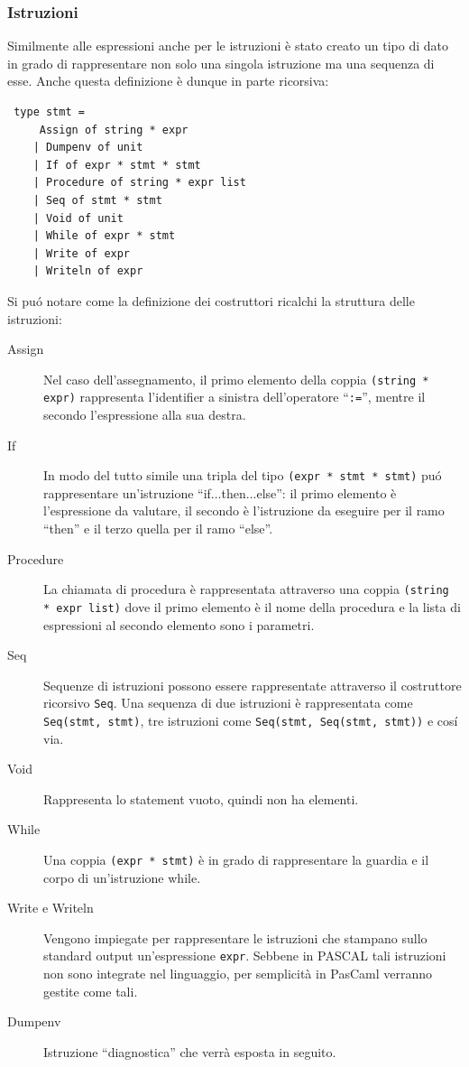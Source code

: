 \documentclass[a4paper,10pt]{article}
\begin{document}
\subsubsection{Istruzioni}
Similmente alle espressioni anche per le istruzioni \`e stato creato un tipo di
dato in grado di rappresentare non solo una singola istruzione ma una sequenza
di esse. Anche questa definizione \`e dunque in parte ricorsiva:

\begin{verbatim}
 type stmt =
     Assign of string * expr
    | Dumpenv of unit
    | If of expr * stmt * stmt
    | Procedure of string * expr list
    | Seq of stmt * stmt
    | Void of unit
    | While of expr * stmt
    | Write of expr
    | Writeln of expr
\end{verbatim}
Si pu\'o notare come la definizione dei costruttori ricalchi la struttura delle
istruzioni:
\begin{description}
 \item[Assign] Nel caso dell'assegnamento, il primo elemento della
coppia \verb|(string * expr)| rappresenta l'identifier a sinistra dell'operatore
``\verb|:=|'', mentre il secondo l'espressione alla sua destra.

\item[If] In modo del tutto simile una tripla del tipo 
\verb|(expr * stmt * stmt)| pu\'o rappresentare un'istruzione
``if...then...else'': il primo elemento \`e l'espressione da valutare, il
secondo \`e l'istruzione da eseguire per il ramo ``then'' e il terzo quella per
il ramo ``else''.

\item[Procedure] La chiamata di procedura \`e rappresentata attraverso una
coppia \verb|(string * expr list)| dove il primo elemento \`e il nome della
procedura e la lista di espressioni al secondo elemento sono i parametri.

\item[Seq] Sequenze di istruzioni possono essere rappresentate attraverso il
costruttore ricorsivo \verb|Seq|. Una sequenza di due istruzioni \`e
rappresentata come \verb|Seq(stmt, stmt)|, tre istruzioni come
\verb|Seq(stmt, Seq(stmt, stmt))| e cos\'i via.

\item[Void] Rappresenta lo statement vuoto, quindi non ha elementi.

\item[While] Una coppia \verb|(expr * stmt)| \`e in grado di rappresentare la
guardia e il corpo di un'istruzione while.

\item[Write e Writeln] Vengono impiegate per rappresentare le istruzioni che
stampano sullo standard output un'espressione \verb|expr|. Sebbene in PASCAL
tali istruzioni non sono integrate nel linguaggio, per semplicit\`a in PasCaml
verranno gestite come tali.

\item[Dumpenv] Istruzione ``diagnostica'' che verr\`a esposta in seguito.
\end{description}
\end{document}
